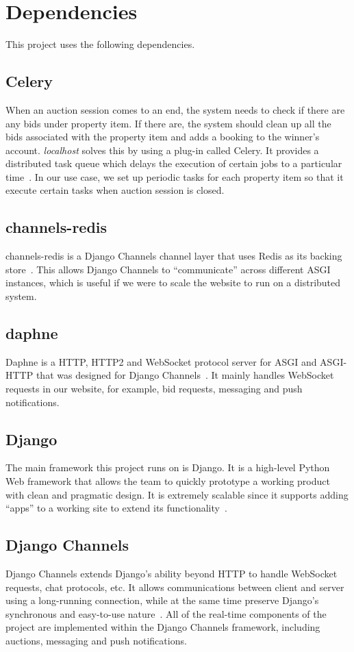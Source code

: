 \section{Dependencies}
This project uses the following dependencies.

\subsection{Celery}
When an auction session comes to an end, the system needs to check if there are
any bids under property item. If there are, the system should clean up all the
bids associated with the property item and adds a booking to the winner's
account. \emph{localhost} solves this by using a plug-in called Celery. It
provides a distributed task queue which delays the execution of certain jobs to
a particular time~\cite{celery-doc}. In our use case, we set up periodic tasks for each property
item so that it execute certain tasks when auction session is closed.

\subsection{channels-redis}
channels-redis is a Django Channels channel layer that uses Redis as its backing
store~\cite{channels-redis-doc}. This allows Django Channels to ``communicate''
across different ASGI instances, which is useful if we were to scale the
website to run on a distributed system.

\subsection{daphne}
Daphne is a HTTP, HTTP2 and WebSocket protocol server for ASGI and ASGI-HTTP
that was designed for Django Channels~\cite{daphne}. It mainly handles WebSocket requests in
our website, for example, bid requests, messaging and push notifications.

\subsection{Django}
The main framework this project runs on is Django. It is a high-level Python Web
framework that allows the team to quickly prototype a working product with clean
and pragmatic design. It is extremely scalable since it supports adding ``apps''
to a working site to extend its functionality~\cite{django}. %

\subsection{Django Channels}
Django Channels extends Django's ability beyond HTTP to handle WebSocket
requests, chat protocols, etc. It allows communications between client and
server using a long-running connection, while at the same time preserve Django's
synchronous and easy-to-use nature~\cite{django-channels-doc}. All of the
real-time components of the project are implemented within the Django Channels
framework, including auctions, messaging and push notifications.

